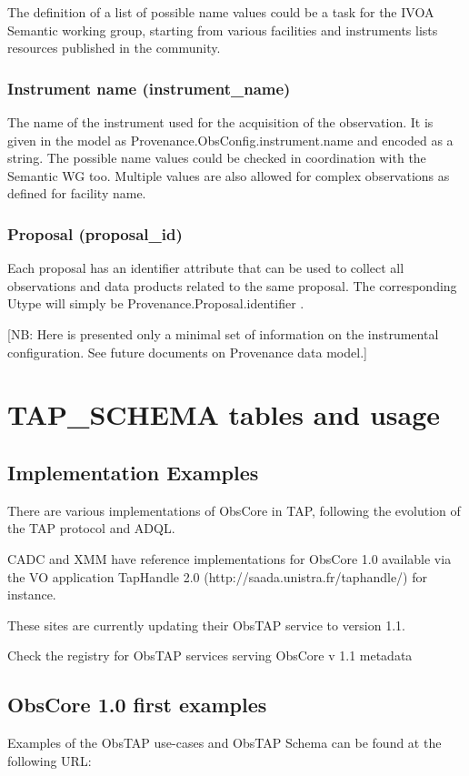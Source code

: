 \documentclass[11pt,a4paper]{ivoa}
\begin{document}
The definition of a list of possible name values could be a task for the IVOA Semantic working group, starting from
various facilities and instruments lists resources published in the community.

\subsubsection{Instrument name (instrument\_name)}
The name of the instrument used for the acquisition of the observation.  It is given in the model as
Provenance.ObsConfig.instrument.name and encoded as a string. The possible name values could be checked in coordination
with the Semantic WG too. Multiple values are also allowed for complex observations as defined for facility name. 

\subsubsection{Proposal (proposal\_id)}
Each proposal has an identifier attribute that can be used to collect all observations and data products related to the
same proposal. The corresponding Utype will simply be Provenance.Proposal.identifier .

[NB: Here is presented only a minimal set of information on the instrumental configuration. See future documents on
Provenance data model.]

\section{TAP\_SCHEMA tables and usage}
\subsection{Implementation Examples}
There are various implementations of ObsCore in TAP, following the evolution of the TAP protocol and ADQL. 

CADC and XMM have reference implementations for ObsCore 1.0 available via the VO application TapHandle 2.0
(http://saada.unistra.fr/taphandle/) for instance.

These sites are currently updating their ObsTAP service to version 1.1.

Check the registry for ObsTAP services serving ObsCore v 1.1 metadata

\subsection{ObsCore 1.0 first examples}
\label{bkm:Ref303703299} Examples of the ObsTAP use-cases and ObsTAP Schema can be found at the following URL:
\end{document}
